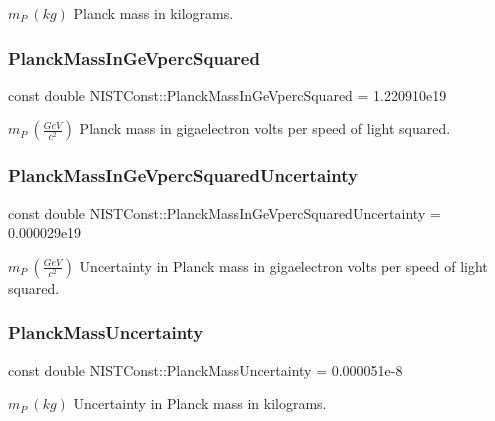 $m_P \ (kg)$ Planck mass in kilograms. \mbox{\label{group___n_i_s_t_const-_planck_mass_ga71709062f673aeed0bed395299d84a68}} 
\subsubsection{\texorpdfstring{Planck\+Mass\+In\+Ge\+Vperc\+Squared}{PlanckMassInGeVpercSquared}}
{\footnotesize\ttfamily const double N\+I\+S\+T\+Const\+::\+Planck\+Mass\+In\+Ge\+Vperc\+Squared = 1.\+220910e19}

$m_P \ (\frac{GeV}{c^2})$ Planck mass in gigaelectron volts per speed of light squared. \mbox{\label{group___n_i_s_t_const-_planck_mass_gaab9eed84a649fb1ee6e90b2e15c86b0a}} 
\subsubsection{\texorpdfstring{Planck\+Mass\+In\+Ge\+Vperc\+Squared\+Uncertainty}{PlanckMassInGeVpercSquaredUncertainty}}
{\footnotesize\ttfamily const double N\+I\+S\+T\+Const\+::\+Planck\+Mass\+In\+Ge\+Vperc\+Squared\+Uncertainty = 0.\+000029e19}

$m_P \ (\frac{GeV}{c^2})$ Uncertainty in Planck mass in gigaelectron volts per speed of light squared. \mbox{\label{group___n_i_s_t_const-_planck_mass_ga500eef372db7d6dcddd4a4a2d3e03b00}} 
\subsubsection{\texorpdfstring{Planck\+Mass\+Uncertainty}{PlanckMassUncertainty}}
{\footnotesize\ttfamily const double N\+I\+S\+T\+Const\+::\+Planck\+Mass\+Uncertainty = 0.\+000051e-\/8}

$m_P \ (kg)$ Uncertainty in Planck mass in kilograms. 